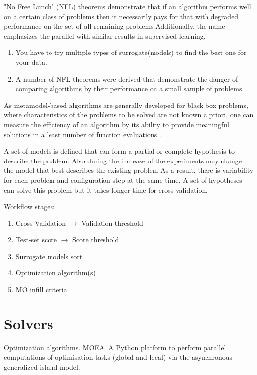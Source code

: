     "No Free Lunch" (NFL) theorems demonstrate that if an algorithm performs well on a certain class of problems then it necessarily pays for that with degraded performance on the set of all remaining problems Additionally, the name emphasizes the parallel with similar results in supervised learning.
    \begin{enumerate}
        \item You have to try multiple types of surrogate(models) to find the best one for your data.
        \item A number of NFL theorems were derived that demonstrate the danger of comparing algorithms by their performance on a small sample of problems.
    \end{enumerate}

    As metamodel-based algorithms are generally developed for black box problems, where characteristics of the problems to be solved are not known a priori, one can measure the efficiency of an algorithm by its ability to provide meaningful solutions in a least number of function evaluations \cite{SoftSurvey}.

    A set of models is defined that can form a partial or complete hypothesis to describe the problem. Also during the increase of the experiments may change the model that best describes the existing problem As a result, there is variability for each problem and configuration step at the same time. A set of hypotheses can solve this problem but it takes longer time for cross validation.

    Workflow stages:
    \begin{enumerate}
        \item Cross-Validation $\rightarrow$ Validation threshold
        \item Test-set score $\rightarrow$ Score threshold
        \item Surrogate models sort
        \item Optimization algorithm(s)
        \item MO infill criteria
    \end{enumerate}

\section{Solvers}
    Optimization algorithms. MOEA. A Python platform\cite{francesco_biscani_2019}  to perform parallel computations of optimisation tasks (global and local) via the asynchronous generalized island model.

